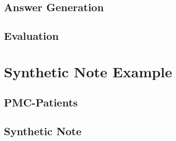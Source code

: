 \documentclass[11pt]{article}
\begin{document}
\vfill\eject


\subsection{Answer Generation}
\begin{tcolorbox}
\small

\end{tcolorbox}

\vfill\eject


\subsection{Evaluation} \label{Eval_prompt}
\begin{tcolorbox}
\small

\end{tcolorbox}

% 

% 

\vfill\eject

\onecolumn

\section{Synthetic Note Example} \label{synthetic_example}
\subsection{PMC-Patients}
\begin{figure*}[!htbp]
    \centering
    \begin{tcolorbox}
    \small
    
    \end{tcolorbox}
\end{figure*}

\newpage

\subsection{Synthetic Note} 
\begin{figure*}[!htbp]
    \begin{tcolorbox}
    \small
    
    \end{tcolorbox}
\end{figure*}
\end{document}
